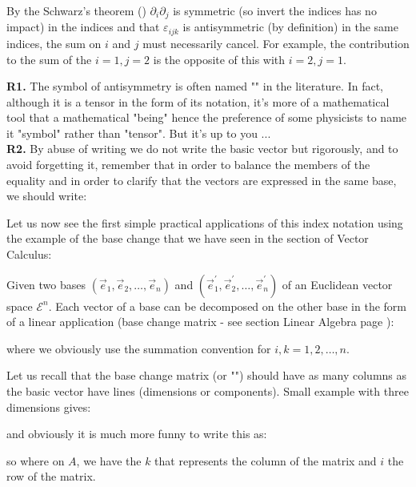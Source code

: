 	By the Schwarz's theorem () $\partial_i\partial_j$ is symmetric (so invert the indices has no impact) in the indices and that $\varepsilon_{ijk}$ is antisymmetric (by definition) in the same indices, the sum on $i$ and $j$ must necessarily cancel. For example, the contribution to the sum of the $i=1,j=2$ is the opposite of this with $i=2,j=1$.
	
	\begin{tcolorbox}[title=Remarks,colframe=black,arc=10pt]
	\textbf{R1.} The symbol of antisymmetry is often named "" in the literature. In fact, although it is a tensor in the form of its notation, it's more of a mathematical tool that a mathematical "being" hence the preference of some physicists to name it "symbol" rather than "tensor". But it's up to you ...\\
	
	\textbf{R2.} By abuse of writing we do not write the basic vector but rigorously, and to avoid forgetting it, remember that in order to balance the members of the equality and in order to clarify that the vectors are expressed in the same base, we should write:
	
	\end{tcolorbox}
	Let us now see the first simple practical applications of this index notation using the example of the base change that we have seen in the section of Vector Calculus:
	
	Given two bases $(\vec{e}_1,\vec{e}_2,\ldots,\vec{e}_n)$ and $(\vec{e}_1^{\prime},\vec{e}_2^{\prime},\ldots,\vec{e}_n^{\prime})$ of an Euclidean vector space $\mathcal{E}^n$. Each vector of a base can be decomposed on the other base in the form of a linear application (base change matrix - see section Linear Algebra page \pageref{change of basis}):
	
	where we obviously use the summation convention for $i,k=1,2,\ldots,n$.
	
	Let us recall that the base change matrix (or "") should have as many columns as the basic vector have lines (dimensions or components). Small example with three dimensions gives:
	
	and obviously it is much more funny to write this as:
	
	so where on $A$, we have the $k$ that represents the column of the matrix and $i$ the row of the matrix.

